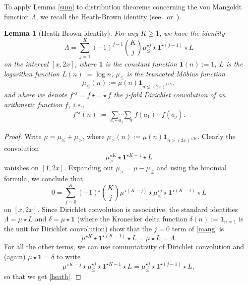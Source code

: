 \documentclass[12pt,a4paper,reqno]{amsart}
\numberwithin{equation}{section}
\theoremstyle{plain}
\newtheorem{lemma}[theorem]{Lemma}
\theoremstyle{definition}
\newcommand\multsum{\mathop{\sum\cdots\sum}\limits}
\newcommand{\onef}{\mathbf{1}}
\begin{document}
To apply Lemma \ref{sum} to distribution theorems concerning the von
Mangoldt function $\Lambda$, we recall the Heath-Brown identity
(see~\cite{hb-ident} or~\cite[Prop. 13.3]{ik}).

\begin{lemma}[Heath-Brown identity]\label{hbi}  For any $K \ge 1$, we have the identity
\begin{equation}\label{heath}
  \Lambda =\sum_{j=1}^K (-1)^{j-1} \binom{K}{j} \mu_{\leq}^{\star j} 
  \star \onef^{\star (j-1)} \star L
\end{equation}
on the interval $[x,2x]$, where $\onef$ is the constant function
$\onef(n) := 1$, $L$ is the logarithm function $L(n) := \log n$,
$\mu_{\leq}$ is the truncated M\"obius function
$$ \mu_{\leq}(n) := \mu(n) \onef_{n \leq (2x)^{1/K}},$$
and where we denote $f^{\star j} = f \star \ldots \star f$ the
$j$-fold Dirichlet convolution of an arithmetic function $f$, i.e.,
$$
f^{\star j}(n):=\multsum_{a_1\cdots a_j=n}{f(a_1)\cdots f(a_j)}.
$$
\end{lemma}

\begin{proof} Write $\mu = \mu_{\leq} + \mu_>$, where $\mu_>(n) :=
  \mu(n) \onef_{n > (2x)^{1/K}}$.  Clearly the convolution
$$ \mu_>^{\star K} \star \onef^{\star K-1} \star L$$
vanishes on $[1,2x]$.  Expanding out $\mu_> = \mu - \mu_\leq$ and
using the binomial formula, we conclude that
\begin{equation}\label{mang}
  0 = \sum_{j=0}^K (-1)^{j} \binom{K}{j} \mu^{\star (K-j)} \star 
  \mu_{\leq}^{\star j} \star \onef^{\star (K-1)} \star L
\end{equation}
on $[x,2x]$.  Since Dirichlet convolution is associative, the standard
identities $\Lambda = \mu \star L$ and $\delta = \mu \star \onef$
(where the Kronecker delta function $\delta(n) := \onef_{n=1}$ is the
unit for Dirichlet convolution) show that the $j=0$ term of
\eqref{mang} is
$$
\mu^{\star K}\star \onef^{\star (K-1)}\star L=\mu\star L=\Lambda.
$$
For all the other terms, we can use commutativity of Dirichlet
convolution and (again) $\mu\star \onef=\delta$ to write
$$
\mu^{\star K-j} \star \mu_{\leq}^{\star j} \star \onef^{\star
  K-1} \star L=
 \mu_{\leq}^{\star j} \star \onef^{\star (j-1)} \star L,
$$
so that we get \eqref{heath}.
\end{proof}
\end{document}
